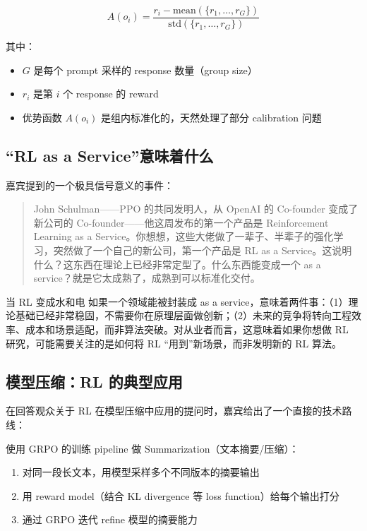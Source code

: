 $$
A(o_i) = \frac{r_i - \text{mean}(\{r_1, \dots, r_G\})}{\text{std}(\{r_1, \dots, r_G\})}
$$

其中：
\begin{itemize}
    \item $G$ 是每个 prompt 采样的 response 数量（group size）
    \item $r_i$ 是第 $i$ 个 response 的 reward
    \item 优势函数 $A(o_i)$ 是组内标准化的，天然处理了部分 calibration 问题
\end{itemize}

\subsection{``RL as a Service''意味着什么}

嘉宾提到的一个极具信号意义的事件：

\begin{quote}
John Schulman——PPO 的共同发明人，从 OpenAI 的 Co-founder 变成了新公司的 Co-founder——他这周发布的第一个产品是 Reinforcement Learning as a Service。你想想，这些大佬做了一辈子、半辈子的强化学习，突然做了一个自己的新公司，第一个产品是 RL as a Service。这说明什么？这东西在理论上已经非常定型了。什么东西能变成一个 as a service？就是它太成熟了，成熟到可以标准化交付。
\end{quote}

\begin{warningbox}{当 RL 变成水和电}
如果一个领域能被封装成 as a service，意味着两件事：（1）理论基础已经非常稳固，不需要你在原理层面做创新；（2）未来的竞争将转向工程效率、成本和场景适配，而非算法突破。对从业者而言，这意味着如果你想做 RL 研究，可能需要关注的是如何将 RL ``用到''新场景，而非发明新的 RL 算法。
\end{warningbox}

\subsection{模型压缩：RL 的典型应用}

在回答观众关于 RL 在模型压缩中应用的提问时，嘉宾给出了一个直接的技术路线：

使用 GRPO 的训练 pipeline 做 Summarization（文本摘要/压缩）：
\begin{enumerate}
    \item 对同一段长文本，用模型采样多个不同版本的摘要输出
    \item 用 reward model（结合 KL divergence 等 loss function）给每个输出打分
    \item 通过 GRPO 迭代 refine 模型的摘要能力
\end{enumerate}

